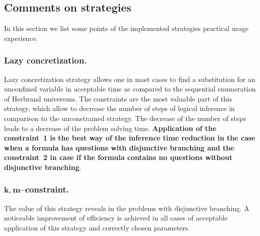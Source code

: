 \documentclass[runningheads,a4paper]{llncs}
\begin{document}









\subsection{Comments on strategies}

In this section we list some points of the implemented strategies practical usage experience.

\subsubsection{Lazy concretization.}
Lazy concretization strategy allows one in most cases to find a substitution for an unconfined variable in acceptable time as compared to the sequential enumeration of Herbrand universum. The constraints are the most valuable part of this strategy, which allow to decrease the number of steps of logical inference in comparison to the unconstrained strategy. The decrease of the number of steps leads to a decrease of the problem solving time. \textbf{Application of the constraint~1 is the best way of the inference time reduction in the case when a formula has questions with disjunctive branching and the constraint~2 in case if the formula contains no questions without disjunctive branching}.


\subsubsection{$\boldsymbol{k,m}$--constraint.}
The value of this strategy reveals in the problems with disjunctive branching. A noticeable improvement of efficiency is achieved in all cases of acceptable application of this strategy and correctly chosen parameters.
\end{document}
